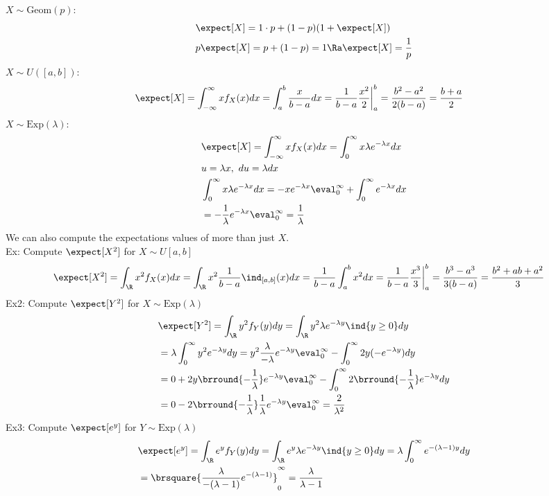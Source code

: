 $X\sim\mathrm{Geom}(p)$:
\begin{align*}
    &\expect[X]=1\cdot p+(1-p)(1+\expect[X])\\
    &p\expect[X]=p+(1-p)=1\Ra \expect[X]=\frac{1}{p}
\end{align*}
$X\sim U([a,b])$:
\begin{align*}
    &\expect[X]=\int_{-\infty}^\infty xf_X(x)dx=\int_a^b\frac{x}{b-a}dx=\frac{1}{b-a}\frac{x^2}{2}\bigg|_a^b=\frac{b^2-a^2}{2(b-a)}=\frac{b+a}{2}
\end{align*}
$X\sim\mathrm{Exp}(\lambda)$:
\begin{align*}
    &\expect[X]=\int_{-\infty}^\infty xf_X(x)dx=\int_0^\infty x\lambda e^{-\lambda x}dx\\
    &u=\lambda x,\ du=\lambda dx\\
    &\int_0^\infty x\lambda e^{-\lambda x}dx=-xe^{-\lambda x}\eval_0^\infty+\int_0^\infty e^{-\lambda x}dx\\
    &=-\frac{1}{\lambda}e^{-\lambda x}\eval_0^\infty=\frac{1}{\lambda}
\end{align*}
We can also compute the expectations values of more than just $X$.\\
Ex: Compute $\expect[X^2]$ for $X\sim U[a,b]$
\begin{align*}
    &\expect[X^2]=\int_\R x^2f_X(x)dx=\int_\R x^2\frac{1}{b-a}\ind_{[a,b]}(x)dx=\frac{1}{b-a}\int_a^bx^2dx=\frac{1}{b-a}\frac{x^3}{3}\bigg|_a^b=\frac{b^3-a^3}{3(b-a)}=\frac{b^2+ab+a^2}{3}
\end{align*}
Ex2: Compute $\expect[Y^2]$ for $X\sim\mathrm{Exp}(\lambda)$
\begin{align*}
    &\expect[Y^2]=\int_\R y^2f_Y(y)dy=\int_\R y^2\lambda e^{-\lambda y}\ind\{y\geq 0\}dy\\
    &=\lambda\int_0^\infty y^2e^{-\lambda y}dy=y^2\frac{\lambda}{-\lambda}e^{-\lambda y}\eval_0^\infty-\int_0^\infty 2y(-e^{-\lambda y})dy\\
    &=0+2y\brround{-\frac{1}{\lambda}}e^{-\lambda y}\eval_0^\infty-\int_0^\infty 2\brround{-\frac{1}{\lambda}}e^{-\lambda y}dy\\
    &=0-2\brround{-\frac{1}{\lambda}}\frac{1}{\lambda}e^{-\lambda y}\eval_0^\infty=\frac{2}{\lambda^2}
\end{align*}
Ex3: Compute $\expect[e^y]$ for $Y\sim\mathrm{Exp}(\lambda)$
\begin{align*}
    &\expect[e^y]=\int_\R e^yf_Y(y)dy=\int_\R e^y\lambda e^{-\lambda y}\ind\{y\geq 0\}dy=\lambda\int_0^\infty e^{-(\lambda-1)y}dy\\
    &=\brsquare{\frac{\lambda}{-(\lambda-1)}e^{-(\lambda-1)}}_0^\infty=\frac{\lambda}{\lambda-1}
\end{align*}
